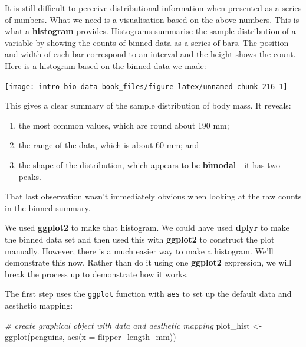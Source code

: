 \documentclass[
]{book}
\newenvironment{Shaded}{\begin{snugshade}}{\end{snugshade}}
\newcommand{\AttributeTok}[1]{\textcolor[rgb]{0.77,0.63,0.00}{#1}}
\newcommand{\CommentTok}[1]{\textcolor[rgb]{0.56,0.35,0.01}{\textit{#1}}}
\newcommand{\FunctionTok}[1]{\textcolor[rgb]{0.00,0.00,0.00}{#1}}
\newcommand{\NormalTok}[1]{#1}
\newcommand{\OtherTok}[1]{\textcolor[rgb]{0.56,0.35,0.01}{#1}}
\providecommand{\tightlist}{%
  \setlength{\itemsep}{0pt}\setlength{\parskip}{0pt}}
\begin{document}
It is still difficult to perceive distributional information when presented as a series of numbers. What we need is a visualisation based on the above numbers. This is what a \textbf{histogram} provides. Histograms summarise the sample distribution of a variable by showing the counts of binned data as a series of bars. The position and width of each bar correspond to an interval and the height shows the count. Here is a histogram based on the binned data we made:

\begin{center}\texttt{[image: intro-bio-data-book\_files/figure-latex/unnamed-chunk-216-1]} \end{center}

This gives a clear summary of the sample distribution of body mass. It reveals:

\begin{enumerate}
\def\labelenumi{\arabic{enumi}.}
\tightlist
\item
  the most common values, which are round about 190 mm;
\item
  the range of the data, which is about 60 mm; and
\item
  the shape of the distribution, which appears to be \textbf{bimodal}---it has two peaks.
\end{enumerate}

That last observation wasn't immediately obvious when looking at the raw counts in the binned summary.

We used \textbf{ggplot2} to make that histogram. We could have used \textbf{dplyr} to make the binned data set and then used this with \textbf{ggplot2} to construct the plot manually. However, there is a much easier way to make a histogram. We'll demonstrate this now. Rather than do it using one \textbf{ggplot2} expression, we will break the process up to demonstrate how it works.

The first step uses the \texttt{ggplot} function with \texttt{aes} to set up the default data and aesthetic mapping:

\begin{Shaded}
\begin{Highlighting}[]
\CommentTok{\# create graphical object with data and aesthetic mapping}
\NormalTok{plot\_hist }\OtherTok{\textless{}{-}} \FunctionTok{ggplot}\NormalTok{(penguins, }\FunctionTok{aes}\NormalTok{(}\AttributeTok{x =}\NormalTok{ flipper\_length\_mm))}
\end{Highlighting}
\end{Shaded}
\end{document}

